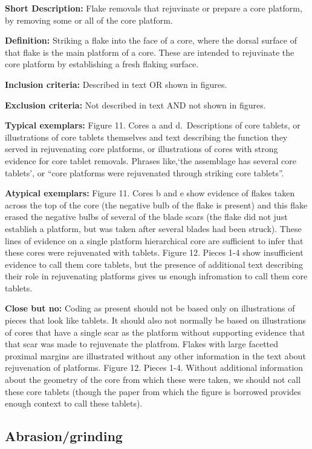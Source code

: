 \documentclass[
]{article}
\begin{document}
\textbf{Short Description:} Flake removals that rejuvinate or prepare a
core platform, by removing some or all of the core platform.

\textbf{Definition:} Striking a flake into the face of a core, where the
dorsal surface of that flake is the main platform of a core. These are
intended to rejuvinate the core platform by establishing a fresh flaking
surface.

\textbf{Inclusion criteria:} Described in text OR shown in figures.

\textbf{Exclusion criteria:} Not described in text AND not shown in
figures.

\textbf{Typical exemplars:} Figure 11. Cores a and d.~Descriptions of
core tablets, or illustrations of core tablets themselves and text
describing the function they served in rejuvenating core platforms, or
illustrations of cores with strong evidence for core tablet removals.
Phrases like,`the assemblage has several core tablets', or ``core
platforms were rejuvenated through striking core tablets''.

\textbf{Atypical exemplars:} Figure 11. Cores b and e show evidence of
flakes taken across the top of the core (the negative bulb of the flake
is present) and this flake erased the negative bulbs of several of the
blade scars (the flake did not just establish a platform, but was taken
after several blades had been struck). These lines of evidence on a
single platform hierarchical core are sufficient to infer that these
cores were rejuvenated with tablets. Figure 12. Pieces 1-4 show
insufficient evidence to call them core tablets, but the presence of
additional text describing their role in rejuvenating platforms gives us
enough infromation to call them core tablets.

\textbf{Close but no:} Coding as present should not be based only on
illustrations of pieces that look like tablets. It should also not
normally be based on illustrations of cores that have a single scar as
the platform without supporting evidence that that scar was made to
rejuvenate the platfrom. Flakes with large facetted proximal margins are
illustrated without any other information in the text about rejuvenation
of platforms. Figure 12. Pieces 1-4. Without additional information
about the geometry of the core from which these were taken, we should
not call these core tablets (though the paper from which the figure is
borrowed provides enough context to call these tablets).

\hypertarget{abrasiongrinding}{%
\subsection{Abrasion/grinding}\label{abrasiongrinding}}
\end{document}
